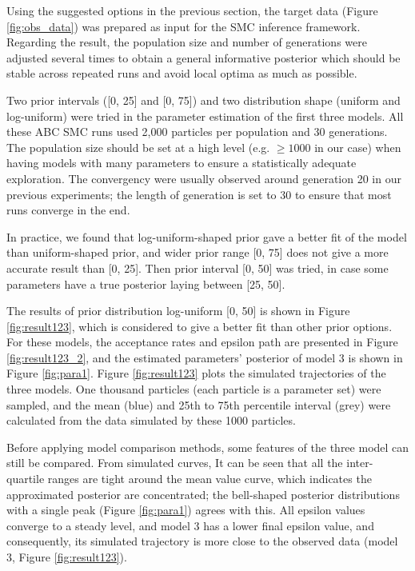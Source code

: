 Using the suggested options in the previous section, the target data (Figure \ref{fig:obs_data}) was prepared as input for the SMC inference framework. Regarding the result, the population size and number of generations were adjusted several times to obtain a general informative posterior which should be stable across repeated runs and avoid local optima as much as possible.

Two prior intervals ([0, 25] and [0, 75]) and two distribution shape (uniform and log-uniform) were tried in the parameter estimation of the first three models. All these ABC SMC runs used 2,000 particles per population and 30 generations. The population size should be set at a high level (e.g. $\geq 1000$ in our case) when having models with many parameters to ensure a statistically adequate exploration. The convergency were usually observed around generation 20 in our previous experiments; the length of generation is set to 30 to ensure that most runs converge in the end. 

In practice, we found that log-uniform-shaped prior gave a better fit of the model than uniform-shaped prior, and wider prior range [0, 75] does not give a more accurate result than [0, 25]. Then prior interval [0, 50] was tried, in case some parameters have a true posterior laying between [25, 50].

The results of prior distribution log-uniform [0, 50] is shown in Figure \ref{fig:result123}, which is considered to give a better fit than other prior options. For these models, the acceptance rates and epsilon path are presented in Figure \ref{fig:result123_2}, and the estimated parameters' posterior of model 3 is shown in Figure \ref{fig:para1}. Figure \ref{fig:result123} plots the simulated trajectories of the three models. One thousand particles (each particle is a parameter set) were sampled, and the mean (blue) and 25th to 75th percentile interval (grey) were calculated from the data simulated by these 1000 particles.

Before applying model comparison methods, some features of the three model can still be compared. From simulated curves, It can be seen that all the inter-quartile ranges are tight around the mean value curve, which indicates the approximated posterior are concentrated; the bell-shaped posterior distributions with a single peak (Figure \ref{fig:para1}) agrees with this. All epsilon values converge to a steady level, and model 3 has a lower final epsilon value, and consequently, its simulated trajectory is more close to the observed data (model 3, Figure \ref{fig:result123}).

